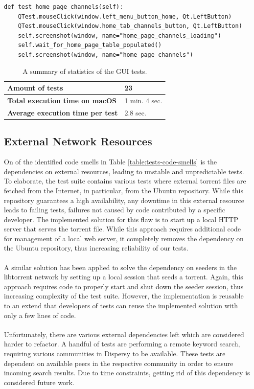 \begin{lstlisting}[caption={An example of a test that tests the new Qt Tribler GUI.},label={lst:qtest-sample}]
def test_home_page_channels(self):
	QTest.mouseClick(window.left_menu_button_home, Qt.LeftButton)
	QTest.mouseClick(window.home_tab_channels_button, Qt.LeftButton)
	self.screenshot(window, name="home_page_channels_loading")
	self.wait_for_home_page_table_populated()
	self.screenshot(window, name="home_page_channels")
\end{lstlisting}

\begin{table}[h!]
	\centering
	\begin{tabular}{|l|l|}
		\hline
		\textbf{Amount of tests} & 23 \\ \hline
		\textbf{Total execution time on macOS} & 1 min. 4 sec. \\ \hline
		\textbf{Average execution time per test} & 2.8 sec.\\ \hline
	\end{tabular}
	\caption{A summary of statistics of the GUI tests.}
	\label{table:gui-tests-summary}
\end{table}

\subsection{External Network Resources}
\label{subsec:external-network-resources}
On of the identified code smells in Table \ref{table:tests-code-smells} is the dependencies on external resources, leading to unstable and unpredictable tests. To elaborate, the test suite contains various tests where external torrent files are fetched from the Internet, in particular, from the Ubuntu repository. While this repository guarantees a high availability, any downtime in this external resource leads to failing tests, failures not caused by code contributed by a specific developer. The implemented solution for this flaw is to start up a local HTTP server that serves the torrent file. While this approach requires additional code for management of a local web server, it completely removes the dependency on the Ubuntu repository, thus increasing reliability of our tests.\\\\
A similar solution has been applied to solve the dependency on seeders in the libtorrent network by setting up a local session that seeds a torrent. Again, this approach requires code to properly start and shut down the seeder session, thus increasing complexity of the test suite. However, the implementation is reusable to an extend that developers of tests can reuse the implemented solution with only a few lines of code.\\\\
Unfortunately, there are various external dependencies left which are considered harder to refactor. A handful of tests are performing a remote keyword search, requiring various communities in Dispersy to be available. These tests are dependent on available peers in the respective community in order to ensure incoming search results. Due to time constraints, getting rid of this dependency is considered future work.

